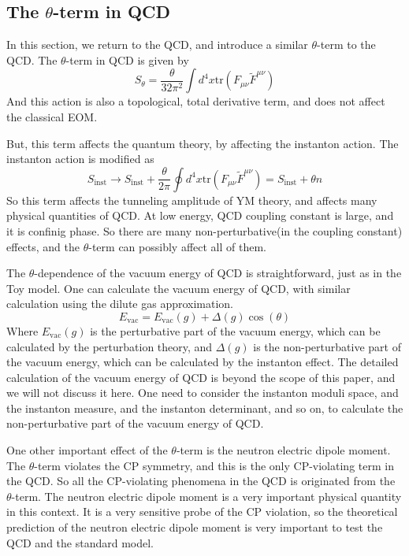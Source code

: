 \documentclass{article}
\begin{document}
\subsection{The $\theta$-term in QCD}

In this section, we return to the QCD, and introduce a similar $\theta$-term to the QCD.
The $\theta$-term in QCD is given by
\[
    S_{\theta} = \frac{\theta}{32\pi^2} \int d^4 x \mathrm{tr}(F_{\mu\nu} \tilde{F}^{\mu\nu})
\]
And this action is also a topological, total derivative term, and does not affect the classical EOM.

But, this term affects the quantum theory, by affecting the instanton action.
The instanton action is modified as
\[
    S_{\text{inst}} \rightarrow S_{\text{inst}} + \frac{\theta}{2\pi} \oint d^4 x \mathrm{tr}(F_{\mu\nu} \tilde{F}^{\mu\nu}) = S_{\text{inst}} + \theta n
\]
So this term affects the tunneling amplitude of YM theory, and affects many physical quantities of QCD.
At low energy, QCD coupling constant is large, and it is confinig phase. So there are many non-perturbative(in the coupling constant) effects, and the $\theta$-term can possibly affect all of them.

The $\theta$-dependence of the vacuum energy of QCD is straightforward, just as in the Toy model.
One can calculate the vacuum energy of QCD, with similar calculation using the dilute gas approximation.
\[
    E_{\text{vac}} = E_{\text{vac}}(g) + \Delta(g) \cos(\theta)
\]
Where $E_{\text{vac}}(g)$ is the perturbative part of the vacuum energy, which can be calculated by the perturbation theory, and $\Delta(g)$ is the non-perturbative part of the vacuum energy, which can be calculated by the instanton effect.
The detailed calculation of the vacuum energy of QCD is beyond the scope of this paper, and we will not discuss it here.
One need to consider the instanton moduli space, and the instanton measure, and the instanton determinant, and so on, to calculate the non-perturbative part of the vacuum energy of QCD.

One other important effect of the $\theta$-term is the neutron electric dipole moment.
The $\theta$-term violates the CP symmetry, and this is the only CP-violating term in the QCD.
So all the CP-violating phenomena in the QCD is originated from the $\theta$-term.
The neutron electric dipole moment is a very important physical quantity in this context.
It is a very sensitive probe of the CP violation, so the theoretical prediction of the neutron electric dipole moment is very important to test the QCD and the standard model. 
\end{document}
